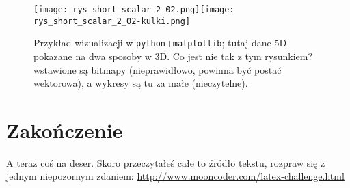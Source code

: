 \documentclass{article}
\begin{document}
\begin{figure}
\begin{center}
\texttt{[image: rys\_short\_scalar\_2\_02.png]}\hfill\texttt{[image: rys\_short\_scalar\_2\_02-kulki.png]}
\end{center}
\caption{Przykład wizualizacji w \texttt{python}+\texttt{matplotlib}; tutaj dane 5D pokazane na dwa sposoby w 3D. Co jest nie tak z tym rysunkiem? wstawione są bitmapy (nieprawidłowo, powinna być postać wektorowa), a wykresy są tu za małe (nieczytelne).}
\label{fig:matplotlib}
\end{figure}

\clearpage %



\section{Zakończenie}

A teraz coś na deser. Skoro przeczytałeś całe to źródło tekstu, rozpraw się z jednym niepozornym zdaniem: \url{http://www.mooncoder.com/latex-challenge.html} %





\end{document}

